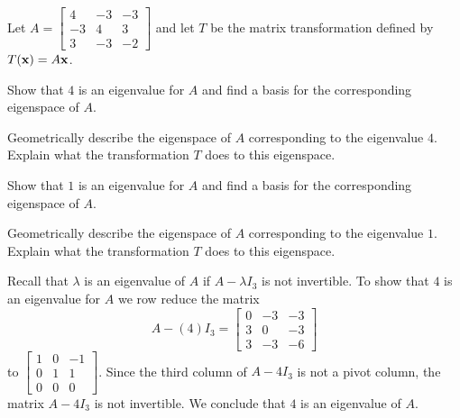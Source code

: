 \begin{example} Let $A = \left[ \begin{array}{rrr} 4&-3&-3\\-3&4&3\\3&-3&-2 \end{array} \right]$ and let $T$ be the matrix transformation defined by $T(\mathbf{x}) = A\mathbf{x}$. 
\ba
\item Show that $4$ is an eigenvalue for $A$ and find a basis for the corresponding eigenspace of $A$.

\item Geometrically describe the eigenspace of $A$ corresponding to the eigenvalue $4$. Explain what the transformation $T$ does to this eigenspace. 

\item Show that $1$ is an eigenvalue for $A$ and find a basis for the corresponding eigenspace of $A$. 

\item Geometrically describe the eigenspace of $A$ corresponding to the eigenvalue $1$. Explain what the transformation $T$ does to this eigenspace. 

\ea

\ExampleSolution
\ba
\item Recall that $\lambda$ is an eigenvalue of $A$ if $A-\lambda I_3$ is not invertible. To show that $4$ is an eigenvalue for $A$ we row reduce the matrix 
\[A - (4)I_3 = \left[ \begin{array}{rrr} 0&-3&-3\\3&0&-3\\3&-3&-6 \end{array} \right]\]
 to $\left[ \begin{array}{ccr} 1&0&-1\\0&1&1\\0&0&0\end{array} \right]$. Since the third column of $A-4I_3$ is not a pivot column, the matrix $A-4I_3$ is not invertible. We conclude that $4$ is an eigenvalue of $A$. 


\end{example}
